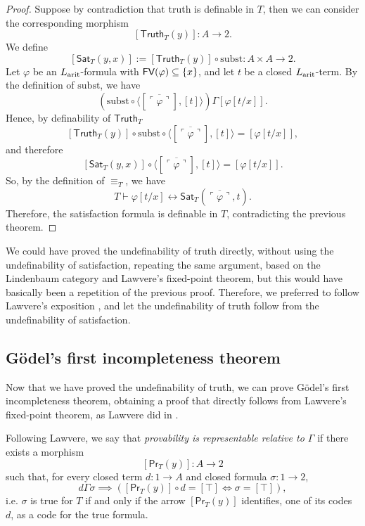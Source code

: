\begin{proof}
    Suppose by contradiction that truth is definable in $T$, then we can consider the corresponding morphism
    \[ [\mathsf{Truth}_T(y)] : A \to 2. \]
    We define
    \[ [\mathsf{Sat}_T(y,x)] := [\mathsf{Truth}_T(y)] \circ \textrm{subst} : A \times A \to 2. \]
    Let $\varphi$ be an $L_{\textnormal{arit}}$-formula with $\textsf{FV}(\varphi)\subseteq\{x\}$, and let $t$ be a closed $L_{\textnormal{arit}}$-term. By the definition of $\textrm{subst}$, we have
    \[ \left(\textrm{subst} \circ \langle[\overline{\ulcorner\varphi\urcorner}],[t]\rangle\right)\Gamma[\varphi[t/x]]. \]
    Hence, by definability of $\mathsf{Truth}_T$
    \[ [\mathsf{Truth}_T(y)] \circ\textrm{subst} \circ \langle[\overline{\ulcorner\varphi\urcorner}],[t]\rangle = [\varphi[t/x]], \]
    and therefore
    \[ [\mathsf{Sat}_T(y,x)] \circ\langle[\overline{\ulcorner\varphi\urcorner}],[t]\rangle = [\varphi[t/x]]. \]
    So, by the definition of $\equiv_T$, we have
    \[ T\vdash\varphi[t/x]\leftrightarrow\mathsf{Sat}_T(\overline{\ulcorner\varphi\urcorner},t). \]
    Therefore, the satisfaction formula is definable in $T$, contradicting the previous theorem.
\end{proof}

\begin{remark}
    We could have proved the undefinability of truth directly, without using the undefinability of satisfaction,
    repeating the same argument, based on the Lindenbaum category and Lawvere's fixed-point theorem, but this
    would have basically been a repetition of the previous proof. Therefore, we preferred to follow
    Lawvere's exposition \cite[pp.~143--144]{Lawvere1969}, and let the undefinability of truth follow from the undefinability of satisfaction.
\end{remark}

\subsection*{Gödel's first incompleteness theorem}
Now that we have proved the undefinability of truth, we can prove Gödel's first incompleteness theorem,
obtaining a proof that directly follows from Lawvere's fixed-point theorem, as Lawvere did in \cite[pp.~144--145]{Lawvere1969}.

\begin{definition}
Following Lawvere, we say that \emph{provability is representable relative to $\Gamma$} if there exists a morphism
\[ [\mathsf{Pr}_T(y)] : A \to 2 \]
such that, for every closed term $d : 1 \to A$ and closed formula $\sigma : 1 \to 2$,
\[ d\Gamma\sigma \implies \left([\mathsf{Pr}_T(y)] \circ d = [\top] \iff \sigma = [\top]\right), \]
i.e. $\sigma$ is true for $T$ if and only if the arrow $[\mathsf{Pr}_T(y)]$ identifies, one of its codes $d$, as a code for the true formula.
\end{definition}

